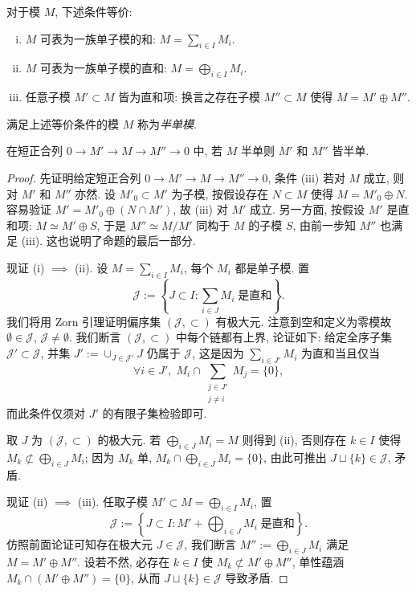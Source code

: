 \begin{proposition}
	对于模 $M$, 下述条件等价:
	\begin{enumerate}[(i)]
		\item $M$ 可表为一族单子模的和: $M = \sum_{i \in I} M_i$.
		\item $M$ 可表为一族单子模的直和: $M = \bigoplus_{i \in I} M_i$.
		\item 任意子模 $M' \subset M$ 皆为直和项: 换言之存在子模 $M'' \subset M$ 使得 $M = M' \oplus M''$.
	\end{enumerate}
	满足上述等价条件的模 $M$ 称为\emph{半单模}.
	
	在短正合列 $0 \to M' \to M \to M'' \to 0$ 中, 若 $M$ 半单则 $M'$ 和 $M''$ 皆半单.
\end{proposition}
\begin{proof}
	先证明给定短正合列 $0 \to M' \to M \to M'' \to 0$, 条件 (iii) 若对 $M$ 成立, 则对 $M'$ 和 $M''$ 亦然. 设 $M'_0 \subset M'$ 为子模, 按假设存在 $N \subset M$ 使得 $M = M'_0 \oplus N$. 容易验证 $M' = M'_0 \oplus (N \cap M')$, 故 (iii) 对 $M'$ 成立. 另一方面, 按假设 $M'$ 是直和项: $M \simeq M' \oplus S$, 于是 $M'' \simeq M/M'$ 同构于 $M$ 的子模 $S$, 由前一步知 $M''$ 也满足 (iii). 这也说明了命题的最后一部分.

	现证 (i) $\implies$ (ii). 设 $M = \sum_{i \in I} M_i$, 每个 $M_i$ 都是单子模. 置
	\[ \mathcal{J} := \left\{ J \subset I: \sum_{i \in J} M_i \;\text{是直和} \right\}. \]
	我们将用 Zorn 引理证明偏序集 $(\mathcal{J}, \subset)$ 有极大元. 注意到空和定义为零模故 $\emptyset \in \mathcal{J}$, $\mathcal{J} \neq \emptyset$. 我们断言 $(\mathcal{J}, \subset)$ 中每个链都有上界, 论证如下: 给定全序子集 $\mathcal{J}' \subset \mathcal{J}$, 并集 $J' := \cup_{J \in\mathcal{J}'} J$ 仍属于 $\mathcal{J}$, 这是因为 $\sum_{i \in J'} M_i$ 为直和当且仅当
	\[ \forall i \in J', \; M_i \cap \sum_{\substack{j \in J' \\ j \neq i}} M_j = \{0\}, \]
	而此条件仅须对 $J'$ 的有限子集检验即可. 
	
	取 $J$ 为 $(\mathcal{J}, \subset)$ 的极大元. 若 $\bigoplus_{i \in J} M_i = M$ 则得到 (ii), 否则存在 $k \in I$ 使得 $M_k \not\subset \bigoplus_{i \in J} M_i$; 因为 $M_k$ 单, $M_k \cap \bigoplus_{i \in J} M_i = \{0\}$, 由此可推出 $J \sqcup \{k\} \in \mathcal{J}$, 矛盾.
	
	现证 (ii) $\implies$ (iii). 任取子模 $M' \subset M = \bigoplus_{i \in I} M_i$, 置
	\[ \mathcal{J} := \left\{ J \subset I: M' + \bigoplus_{i \in J} M_i \; \text{是直和} \right\}. \]
	仿照前面论证可知存在极大元 $J \in \mathcal{J}$, 我们断言 $M'' := \bigoplus_{i \in J} M_i$ 满足 $M = M' \oplus M''$. 设若不然, 必存在 $k \in I$ 使 $M_k \not\subset M' \oplus M''$, 单性蕴涵 $M_k \cap (M' \oplus M'') = \{0\}$, 从而 $J \sqcup \{k\} \in \mathcal{J}$ 导致矛盾.
	

\end{proof}
